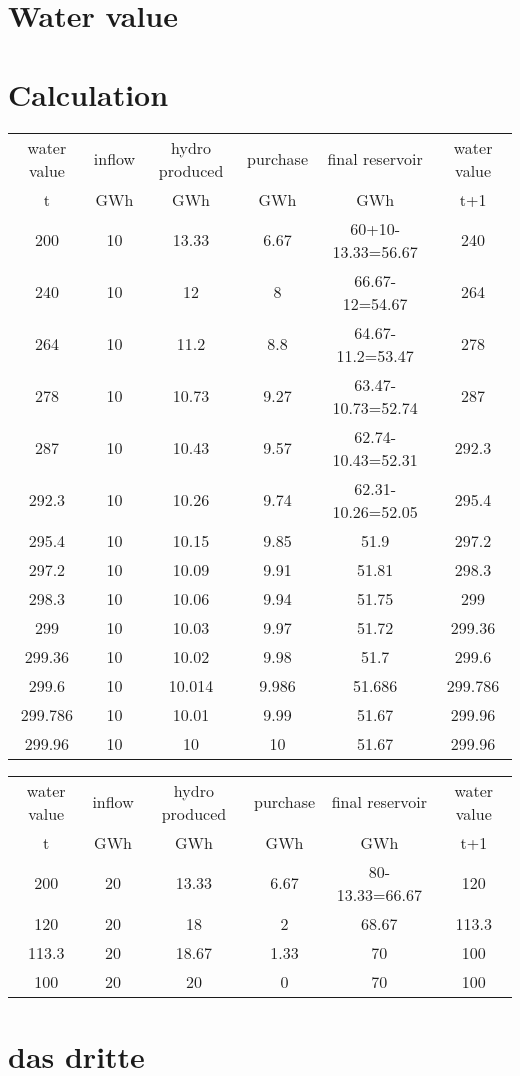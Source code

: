 \documentclass{article}
\begin{document}
\section{Water value}

\section{Calculation}
\begin{center}
\begin{tabular}{|c|c|c|c|c|c|}
\hline
water value & inflow & hydro produced & purchase & final reservoir	& water value\\
    t       &  GWh   &    GWh         &     GWh       &     GWh         & t+1 \\
\hline
\hline
200 & 10 & 13.33 & 6.67 & 60+10-13.33=56.67 & 240\\
240 & 10 & 12 & 8 & 66.67-12=54.67 & 264\\
264 & 10 & 11.2 & 8.8 & 64.67-11.2=53.47 & 278\\
278 & 10 & 10.73 & 9.27 & 63.47-10.73=52.74 & 287\\
287 & 10 & 10.43 & 9.57 & 62.74-10.43=52.31 & 292.3\\
292.3 & 10 & 10.26 & 9.74 & 62.31-10.26=52.05 & 295.4\\
295.4 & 10 & 10.15 & 9.85 & 51.9 & 297.2\\
297.2 & 10 & 10.09 & 9.91 & 51.81 & 298.3\\
298.3 & 10 & 10.06 & 9.94 & 51.75 & 299\\
299 & 10 & 10.03 & 9.97 & 51.72 & 299.36\\
299.36 & 10 & 10.02 & 9.98 & 51.7 & 299.6\\
299.6 & 10 & 10.014 & 9.986 & 51.686 & 299.786\\
299.786 & 10 & 10.01 & 9.99 & 51.67 & 299.96\\
\hline
299.96 & 10 & 10 & 10 & 51.67 & 299.96\\
\hline
\end{tabular}
\end{center}


\begin{center}
\begin{tabular}{|c|c|c|c|c|c|}
\hline
water value & inflow & hydro produced & purchase & final reservoir	& water value\\
    t       &  GWh   &    GWh         &     GWh       &     GWh         & t+1 \\
\hline
\hline
200 & 20 & 13.33 & 6.67 & 80-13.33=66.67 & 120\\
120 & 20 & 18 & 2 & 68.67 & 113.3\\
113.3 & 20 & 18.67 & 1.33 & 70 & 100\\
\hline
100 & 20 & 20 & 0 & 70 & 100\\
\hline
\end{tabular}
\end{center}
\section{das dritte}
\end{document}
